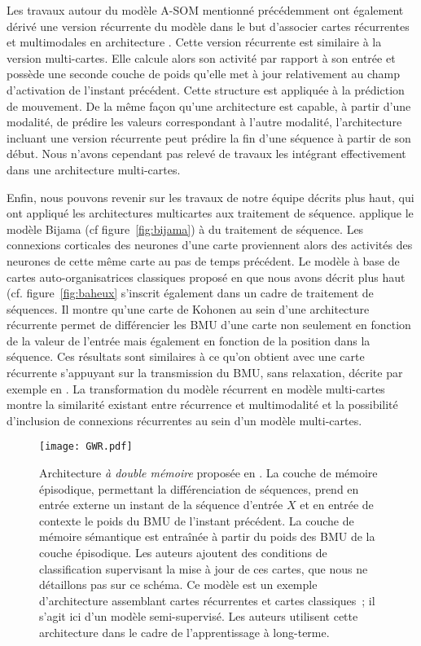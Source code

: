 \documentclass[../main]{subfiles}
\begin{document}
Les travaux autour du modèle A-SOM mentionné précédemment ont également dérivé une version récurrente du modèle dans le but d'associer cartes récurrentes et multimodales en architecture \parencite{Buonamente2015DiscriminatingAS}.
Cette version récurrente est similaire à la version multi-cartes. Elle calcule alors son activité par rapport à son entrée et possède une seconde couche de poids qu'elle met à jour relativement au champ d'activation de l'instant précédent.
Cette structure est appliquée à la prédiction de mouvement. De la même façon qu'une architecture est capable, à partir d'une modalité, de prédire les valeurs correspondant à l'autre modalité, l'architecture incluant une version récurrente peut prédire la fin d'une séquence à partir de son début.
Nous n'avons cependant pas relevé de travaux les intégrant effectivement dans une architecture multi-cartes.

Enfin, nous pouvons revenir sur les travaux de notre équipe décrits plus haut, qui ont appliqué les architectures multicartes aux traitement de séquence.
\cite{khouzam_neural_2014} applique le modèle Bijama (cf figure~\ref{fig:bijama}) à du traitement de séquence. Les connexions corticales des neurones d'une carte proviennent alors des activités des neurones de cette même carte au pas de temps précédent.
Le modèle à base de cartes auto-organisatrices classiques proposé en \cite{baheux_towards_2014} que nous avons décrit plus haut (cf. figure~\ref{fig:baheux} s'inscrit également dans un cadre de traitement de séquences. 
Il montre qu'une carte de Kohonen au sein d'une architecture récurrente permet de différencier les BMU d'une carte non seulement en fonction de la valeur de l'entrée mais également en fonction de la position dans la séquence. Ces résultats sont similaires à ce qu'on obtient avec une carte récurrente s'appuyant sur la transmission du BMU, sans relaxation, décrite par exemple en \cite{fix20}. La transformation du modèle récurrent en modèle multi-cartes montre la similarité existant entre récurrence et multimodalité et la possibilité d'inclusion de connexions récurrentes au sein d'un modèle multi-cartes.


\begin{figure}
    \centering
    \texttt{[image: GWR.pdf]}
    \caption{Architecture \emph{à double mémoire} proposée en \cite{parisiLL}. 
    La couche de mémoire épisodique, permettant la différenciation de séquences, prend en entrée externe un instant de la séquence d'entrée $X$ et en entrée de contexte le poids du BMU de l'instant précédent.
    La couche de mémoire sémantique est entraînée à partir du poids des BMU de la couche épisodique. Les auteurs ajoutent des conditions de classification supervisant la mise à jour de ces cartes, que nous ne détaillons pas sur ce schéma. Ce modèle est un exemple d'architecture assemblant cartes récurrentes et cartes classiques~; il s'agit ici d'un modèle semi-supervisé. Les auteurs utilisent cette architecture dans le cadre de l'apprentissage à long-terme.\label{fig:parisi}}
\end{figure}
\end{document}
